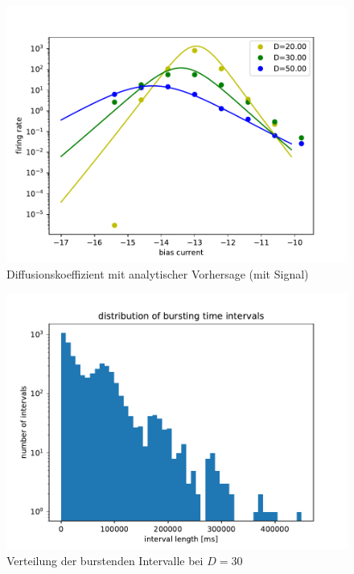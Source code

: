 \documentclass[12pt,a4paper]{article}
\begin{document}
\begin{figure}[H]
	\centering
	\includegraphics[scale=1]{dcomprate3.pdf}\caption{Diffusionskoeffizient mit analytischer Vorhersage (mit Signal)}
	\label{drinanasig}
\end{figure}
\begin{figure}[H]
	\centering
	\includegraphics[scale=1]{bdistajrj2realrinzelpoi26n13001.pdf}\caption{Verteilung der burstenden Intervalle bei $D=30$}
	\label{b3001}
\end{figure}
\end{document}
